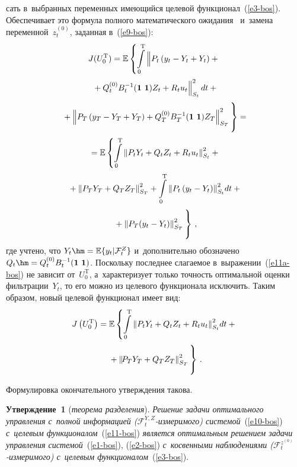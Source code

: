 \begin{multicols}{2}
\noindent
сать в~выбранных переменных имеющийся целевой 
функционал~(\ref{e3-bos}). Обеспечивает это формула полного 
математического ожидания~\cite{15-bos} и~замена переменной~$z_t^{(0)}$, 
заданная в~(\ref{e9-bos}):
     \begin{multline}
     J(U_0^{\mathrm{T}}) =\mathbb{E}\left\{ \int\limits_0^{\mathrm{T}}
     \left\|
     \vphantom{B_t^{-1}Q_t^{(0)}}
      P_t\left(y_t -Y_t +Y_t\right) 
+{}\right.\right.\\[2pt]
\left.{}+Q_t^{(0)} B_t^{-1} (\mathbf{1}\ \mathbf{1})Z_t +R_t u_t \right\|^2_{S_t}dt+{}\\[2pt]
\left.{}+
     \left\| P_T\left(y_T -Y_T+Y_T\right) + Q_T^{(0)} B_T^{-1} (\mathbf{1}\ 
\mathbf{1})Z_T\right\|^2_{S_T}
\vphantom{\int\limits_0^t}
\right\}= {}\\[2pt]
     {}=
     \mathbb{E} \left\{ \int\limits_0^{\mathrm{T}} \left\|  P_t Y_t +Q_t Z_t +R_t 
u_t \right\|^2_{S_t} +{}\right.\\[2pt]
{}+\left\| P_T Y_T +Q_T Z_T \right\|^2_{S_T} + 
\int\limits_0^{\mathrm{T}} \left\| P_t \left(y_t-Y_t\right)\right\|^2_{S_t}\!dt+{}\\[2pt]
\left.{}+\left\| P_T(y_t-
Y_t)\right\|^2_{S_T}
\vphantom{\int\limits_0^t}
\right\}\,,
\label{e11a-bos}
     \end{multline}
где учтено, что $Y_t\hm= \mathbb{E}\{ y_t\vert \mathcal{F}_t^Z\}$ 
и~дополнительно обозначено $Q_t\hm= Q_t^{(0)} B_t^{-1}(\mathbf{1}\  
\mathbf{1})$. Поскольку последнее слагаемое в~выражении~(\ref{e11a-bos})  
не зависит от~$U_0^{\mathrm{T}}$, а~характеризует только точ\-ность оптимальной 
оценки фильтрации~$Y_t$, то его можно из целевого функционала 
исключить. Таким образом, новый целевой функционал имеет вид:
\begin{multline}
J\left(U_0^{\mathrm{T}}\right)=\mathbb{E}\left\{ \int\limits_0^{\mathrm{T}} \left\| P_t Y_t +Q_t Z_t 
+R_tu_t\right\|^2_{S_t}\!dt +{}\right.\\[2pt]
\left.{}+\left\| \!P_T 
Y_T+Q_TZ_T\right\|^2_{S_T}
\vphantom{\int\limits_0^t}
\right\}\,.
\label{e11-bos}
\end{multline}
     
     Формулировка окончательного утверждения такова.
     
     \smallskip
     
     \noindent
     \textbf{Утверждение~1} (\textit{теорема разделения}). \textit{Решение 
задачи оптимального управления с~полной информацией  
($\mathcal{F}_t^{Y,Z}$-из\-ме\-ри\-мо\-го) системой}~(\ref{e10-bos}) 
\textit{с~целевым функционалом}~(\ref{e11-bos}) \textit{является 
оптимальным решением задачи управления системой}~(\ref{e1-bos}), 
(\ref{e2-bos}) \textit{с~косвенными наблюдениями 
($\mathcal{F}_t^{z^{(0)}}$-из\-ме\-ри\-мо\-го) с~целевым 
функ\-цио\-на\-лом}~(\ref{e3-bos}).


\end{multicols}
